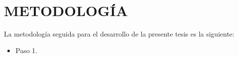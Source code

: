 \section{METODOLOGÍA}

La metodología seguida para el desarrollo de la presente tesis es la siguiente:

\begin{itemize}
	\item

	      Paso 1.
\end{itemize}

